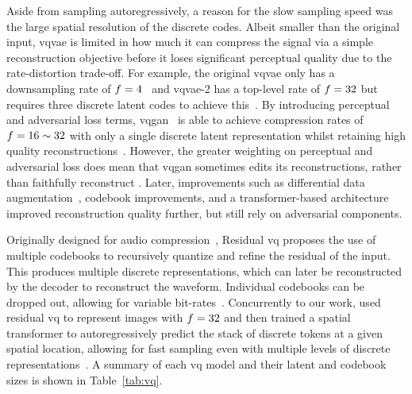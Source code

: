 Aside from sampling autoregressively, a reason for the slow sampling speed was
the large spatial resolution of the discrete codes. Albeit smaller than the
original input, \gls{vqvae} is limited in how much it can compress the signal
via a simple reconstruction objective before it loses significant perceptual
quality due to the rate-distortion trade-off. For example, the original
\gls{vqvae} only has a downsampling rate of
$f=4$~\cite{oord2017vqvae} and \gls{vqvae}-2 has a top-level rate
of $f=32$ but requires three discrete latent codes 
to achieve this~\cite{razavi2019generating}. By introducing perceptual and
adversarial loss terms, \gls{vqgan}~\cite{esser2021taming} is able to achieve
compression rates of $f=16 \sim 32$ with only a single discrete
latent representation whilst retaining high quality
reconstructions~\cite{esser2021taming}. However, the greater weighting on
perceptual and adversarial loss does mean that \gls{vqgan} sometimes edits its
reconstructions, rather than faithfully reconstruct . Later, improvements such as
differential data augmentation~\cite{bondtaylor2021unleashing}, codebook
improvements, and a transformer-based architecture~\cite{yu2021vqgan} improved
reconstruction quality further, but still rely on adversarial components.

Originally designed for audio compression~\cite{zeghidour2021soundstream},
Residual \gls{vq} proposes the use of multiple codebooks to recursively quantize
and refine the residual of the input. This produces multiple discrete
representations, which can later be reconstructed by the decoder to reconstruct
the waveform. Individual codebooks can be dropped out, allowing
for variable bit-rates~\cite{zeghidour2021soundstream}. Concurrently to our
work, \citet{lee2022rqvae} used residual \gls{vq} to represent images with 
$f=32$ and then trained a spatial transformer 
to autoregressively predict the stack of discrete tokens at a given spatial
location, allowing for fast sampling even with multiple levels of discrete
representations~\cite{lee2022rqvae}. A summary of each \gls{vq} model and
their latent and codebook sizes is shown in Table~\ref{tab:vq}.

